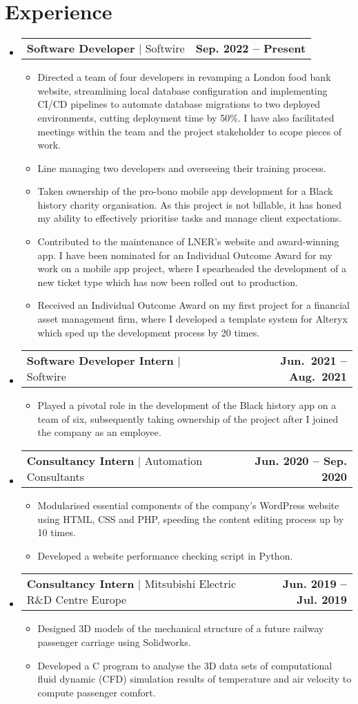 \documentclass[letterpaper,10pt]{article}
\makeatletter
\newcommand{\resumeItem}[1]{
  \item\small{
    {#1 \vspace{-2pt}}
  }
}
\newcommand{\experienceItemHeading}[3]{
  \vspace{-2pt}
  \item
  \begin{tabular*}{0.97\textwidth}[t]{l@{\extracolsep{\fill}}r}
    \textbf{#1} $|$ #3 & \textbf{#2}
  \end{tabular*}\vspace{-7pt}
}
\newcommand{\resumeSubHeadingListStart}{\begin{itemize}[leftmargin=0.15in, label={}]}
\newcommand{\resumeSubHeadingListEnd}{\end{itemize}}
\newcommand{\resumeItemListStart}{\begin{itemize}}
\newcommand{\resumeItemListEnd}{\end{itemize}\vspace{-5pt}}
\makeatother
\begin{document}
\section{Experience}
  \resumeSubHeadingListStart
    \experienceItemHeading
      {Software Developer}
			{Sep. 2022 -- Present}
      {Softwire}
    \resumeItemListStart
      \resumeItem{Directed a team of four developers in revamping a London food bank website, streamlining local database configuration and implementing CI/CD pipelines to automate database migrations to two deployed environments, cutting deployment time by 50\%. I have also facilitated meetings within the team and the project stakeholder to scope pieces of work.}
      \resumeItem{Line managing two developers and overseeing their training process.}
			\resumeItem{Taken ownership of the pro-bono mobile app development for a Black history charity organisation. As this project is not billable, it has honed my ability to effectively prioritise tasks and manage client expectations.}
			\resumeItem{Contributed to the maintenance of LNER’s website and award-winning app. I have been nominated for an Individual Outcome Award for my work on a mobile app project, where I spearheaded the development of a new ticket type which has now been rolled out to production.}
      \resumeItem{Received an Individual Outcome Award on my first project for a financial asset management firm, where I developed a template system for Alteryx which sped up the development process by 20 times.}
    \resumeItemListEnd

    \experienceItemHeading
      {Software Developer Intern}
      {Jun.\ 2021 -- Aug.\ 2021}
      {Softwire}
    \resumeItemListStart
      \resumeItem{Played a pivotal role in the development of the Black history app on a team of six, subsequently taking
      ownership of the project after I joined the company as an employee.}
    \resumeItemListEnd

    \experienceItemHeading
      {Consultancy Intern}
			{Jun. 2020 -- Sep. 2020}
      {Automation Consultants}
    \resumeItemListStart
      \resumeItem{Modularised essential components of the company’s WordPress website using HTML, CSS and PHP,
      speeding the content editing process up by 10 times.}
      \resumeItem{Developed a website performance checking script in Python.}
    \resumeItemListEnd

    \experienceItemHeading
      {Consultancy Intern}
			{Jun. 2019 -- Jul. 2019}
      {Mitsubishi Electric R\&D Centre Europe}
    \resumeItemListStart
      \resumeItem{Designed 3D models of the mechanical structure of a future railway passenger carriage using
      Solidworks.}
      \resumeItem{Developed a C program to analyse the 3D data sets of computational fluid dynamic (CFD) simulation
      results of temperature and air velocity to compute passenger comfort.}
    \resumeItemListEnd
  \resumeSubHeadingListEnd
\end{document}
